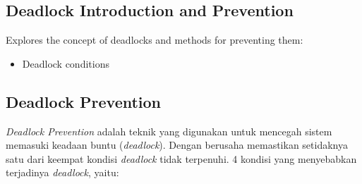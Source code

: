 \documentclass[12pt]{article}
\begin{document}
\subsection{Deadlock Introduction and Prevention}
Explores the concept of deadlocks and methods for preventing them:
\begin{itemize}
    \item Deadlock conditions
    \end{itemize}
    \subsection{Deadlock Prevention} 
\hspace{1cm} \textit{Deadlock Prevention} adalah teknik yang digunakan untuk mencegah sistem memasuki keadaan buntu (\textit{deadlock}). Dengan berusaha memastikan setidaknya  satu dari keempat kondisi \textit{deadlock} tidak terpenuhi. 4 kondisi yang menyebabkan terjadinya \textit{deadlock}, yaitu:
\end{document}

